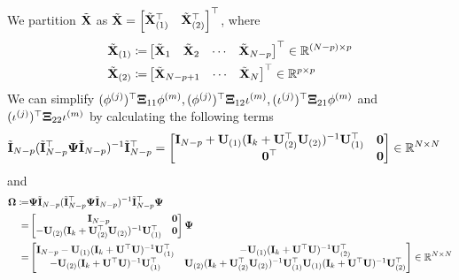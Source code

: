 		
		We partition $\tilde{\mathbf{X}}$ as $\tilde{\mathbf{X}} = \begin{bmatrix}
			\tilde{\mathbf{X}}_{(1)}^\top & \tilde{\mathbf{X}}_{(2)}^\top  
			\end{bmatrix}^\top$, where 
   \begin{align*}
       \tilde{\mathbf{X}}_{(1)} \coloneqq&  \begin{bmatrix}
			\tilde{\mathbf{X}}_1 & \tilde{\mathbf{X}}_2 & \cdots & \tilde{\mathbf{X}}_{N-p}
			\end{bmatrix}^\top \in \mathbb{R}^{(N-p) \times p} \\
   \tilde{\mathbf{X}}_{(2)} \coloneqq& \begin{bmatrix}
			\tilde{\mathbf{X}}_{N-p+1}  & \cdots & \tilde{\mathbf{X}}_{N} \end{bmatrix}^\top \in \mathbb{R}^{p \times p}
   \end{align*}
    We can simplify $(\phi^{(j)})^\top \bm{\Xi}_{11} \phi^{(m)}, (\phi^{(j)})^\top \bm{\Xi}_{12} \iota^{(m)}, (\iota^{(j)})^\top \bm{\Xi}_{21} \phi^{(m)}$ and $(\iota^{(j)})^\top \bm{\Xi}_{22} \iota^{(m)}$  by calculating the following terms
			\begin{align*}
			&	\tilde{\mathbf{I}}_{N-p} (\tilde{\mathbf{I}}_{N-p}^\top \bm{\Psi} \tilde{\mathbf{I}}_{N-p} )^{-1} \tilde{\mathbf{I}}_{N-p}^\top = \begin{bmatrix}
					\mathbf{I}_{N-p} + \mathbf{U}_{(1)} (\mathbf{I}_k + \mathbf{U}_{(2)}^\top \mathbf{U}_{(2)})^{-1} \mathbf{U}_{(1)}^\top & \bm{0} \\ \bm{0}^\top & \bm{0}
				\end{bmatrix} \in \mathbb{R}^{N \times N} 
			\end{align*}
			and
			\begin{align*}
			    \bm{\Omega} \coloneqq& \mathbf{\Psi} \tilde{\mathbf{I}}_{N-p} ( \tilde{\mathbf{I}}_{N-p}^\top \bm{\Psi} \tilde{\mathbf{I}}_{N-p} )^{-1} \tilde{\mathbf{I}}_{N-p}^\top  \mathbf{\Psi} \\
				=&  \begin{bmatrix}
					\mathbf{I}_{N-p}  & \bm{0} \\ - \mathbf{U}_{(2)} (\mathbf{I}_k + \mathbf{U}_{(2)}^\top \mathbf{U}_{(2)})^{-1} \mathbf{U}_{(1)}^\top & \bm{0}
				\end{bmatrix} \mathbf{\Psi} \\ =& \begin{bmatrix}
					\mathbf{I}_{N-p} - \mathbf{U}_{(1)}(\mathbf{I}_k +  \mathbf{U}^\top \mathbf{U})^{-1} \mathbf{U}_{(1)}^\top & -\mathbf{U}_{(1)} (\mathbf{I}_k + \mathbf{U}^\top \mathbf{U})^{-1} \mathbf{U}_{(2)}^\top \\
					- \mathbf{U}_{(2)} (\mathbf{I}_k +  \mathbf{U}^\top \mathbf{U})^{-1} \mathbf{U}_{(1)}^\top & \mathbf{U}_{(2)} (\mathbf{I}_k + \mathbf{U}_{(2)}^\top \mathbf{U}_{(2)})^{-1} \mathbf{U}_{(1)}^\top \mathbf{U}_{(1)} (\mathbf{I}_k +  \mathbf{U}^\top \mathbf{U})^{-1} \mathbf{U}_{(2)}^\top
				\end{bmatrix} \in \mathbb{R}^{N \times N}  
			\end{align*}
